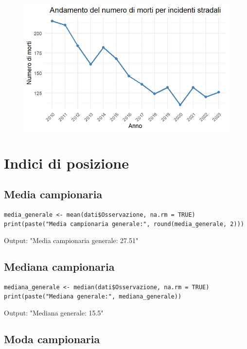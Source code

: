 \documentclass[14pt, openany, titlepage]{report} %
\begin{document}
\begin{figure}[H] %
    \centering
    \includegraphics[width=12cm, height=7cm]{Rplot01.png} %
\end{figure}



\chapter{Indici di posizione}

\section{Media campionaria}
\begin{center}
\begin{lstlisting}[breaklines=true]
media_generale <- mean(dati$Osservazione, na.rm = TRUE)
print(paste("Media campionaria generale:", round(media_generale, 2)))
\end{lstlisting}  
\end{center}

\noindent
Output: "Media campionaria generale: 27.51"

\section{Mediana campionaria}
\begin{center}
\begin{lstlisting}[breaklines=true]
mediana_generale <- median(dati$Osservazione, na.rm = TRUE)
print(paste("Mediana generale:", mediana_generale))
\end{lstlisting}  
\end{center}
\noindent
Output: "Mediana generale: 15.5"


\section{Moda campionaria}
\end{document}

